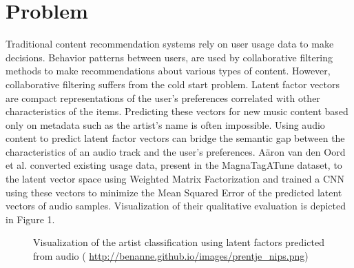 \documentclass[11pt, a4paper]{article}
\begin{document}
  \section{Problem}
    Traditional content recommendation systems rely on user usage data to make
    decisions. Behavior patterns between users, are used by collaborative
    filtering methods to make recommendations about various types of content.
    However, collaborative filtering suffers from the cold start problem.
    Latent factor vectors are compact representations of the user's preferences
    correlated with other characteristics of the items. Predicting these
    vectors for new music content based only on metadata such as the artist's
    name is often impossible. Using audio content to predict latent factor
    vectors can bridge the semantic gap between the characteristics of an audio
    track and the user's preferences. A\"{a}ron van den Oord et al. converted
    existing usage data, present in the MagnaTagATune dataset, to the latent
    vector space using Weighted Matrix Factorization and trained a CNN using
    these vectors to minimize the Mean Squared Error of the predicted latent
    vectors of audio samples. Visualization of their qualitative evaluation is
    depicted in Figure 1.

    \begin{figure}
      \centering
      \caption{Visualization of the artist classification using latent factors
        predicted from audio (
        \url{http://benanne.github.io/images/prentje\_nips.png})}
    \end{figure}
\end{document}

